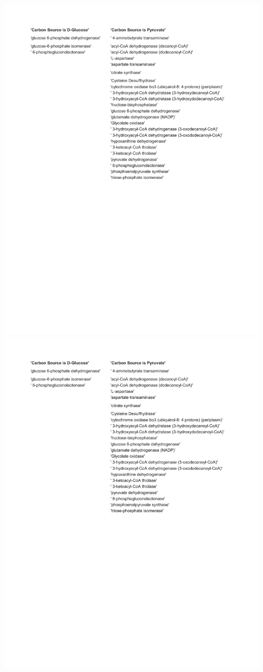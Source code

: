 \documentclass[12pt]{article}
\begin{document}
\newpage
\includegraphics[page=4]{Figures/SuppInfo/CarbonSources.pdf}
\newpage
\includegraphics[page=5]{Figures/SuppInfo/CarbonSources.pdf}
\end{document}
